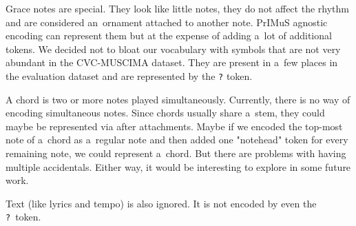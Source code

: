 Grace notes are special. They look like little notes, they do not affect the rhythm and are considered an~ornament attached to another note. PrIMuS agnostic encoding can represent them but at the expense of adding a~lot of additional tokens. We decided not to bloat our vocabulary with symbols that are not very abundant in the CVC-MUSCIMA dataset. They are present in a~few places in the evaluation dataset and are represented by the \verb`?` token.

A chord is two or more notes played simultaneously. Currently, there is no way of encoding simultaneous notes. Since chords usually share a~stem, they could maybe be represented via after attachments. Maybe if we encoded the top-most note of a~chord as a~regular note and then added one "notehead" token for every remaining note, we could represent a~chord. But there are problems with having multiple accidentals. Either way, it would be interesting to explore in some future work.

Text (like lyrics and tempo) is also ignored. It is not encoded by even the \verb`?`~token.

